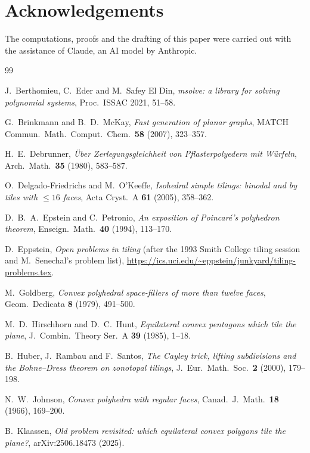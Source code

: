 \documentclass[11pt]{amsart}
\theoremstyle{definition}
\begin{document}
\section*{Acknowledgements}
The computations, proofs and the drafting of this paper were carried out with the assistance of Claude, an AI model
by Anthropic.

\begin{thebibliography}{99}

 J.~Berthomieu, C.~Eder and M.~Safey El Din, \emph{msolve: a library for solving polynomial
systems}, Proc.\ ISSAC 2021, 51--58.

 G.~Brinkmann and B.~D.~McKay, \emph{Fast generation of planar graphs}, MATCH Commun.\ Math.\
Comput.\ Chem.\ \textbf{58} (2007), 323--357.

 H.~E.~Debrunner, \emph{\"Uber Zerlegungsgleichheit von Pflasterpolyedern mit W\"urfeln}, Arch.\
Math.\ \textbf{35} (1980), 583--587.

 O.~Delgado-Friedrichs and M.~O'Keeffe, \emph{Isohedral simple tilings: binodal and by tiles with
$\le16$ faces}, Acta Cryst.\ A \textbf{61} (2005), 358--362.

 D.~B.~A.~Epstein and C.~Petronio, \emph{An exposition of Poincar\'e's polyhedron theorem},
Enseign.\ Math.\ \textbf{40} (1994), 113--170.

 D.~Eppstein, \emph{Open problems in tiling} (after the 1993 Smith College tiling session and M.~Senechal's
problem list), \url{https://ics.uci.edu/~eppstein/junkyard/tiling-problems.tex}.

\bibitem{Gol79} M.~Goldberg, \emph{Convex polyhedral space-fillers of more than twelve faces}, Geom.\ Dedicata
\textbf{8} (1979), 491--500.

 M.~D.~Hirschhorn and D.~C.~Hunt, \emph{Equilateral convex pentagons which tile the plane}, J.\
Combin.\ Theory Ser.\ A \textbf{39} (1985), 1--18.

\bibitem{HRS00} B.~Huber, J.~Rambau and F.~Santos, \emph{The Cayley trick, lifting subdivisions and the
Bohne--Dress theorem on zonotopal tilings}, J.\ Eur.\ Math.\ Soc.\ \textbf{2} (2000), 179--198.

\bibitem{Joh66} N.~W.~Johnson, \emph{Convex polyhedra with regular faces}, Canad.\ J.\ Math.\ \textbf{18} (1966),
169--200.

\bibitem{Kla25} B.~Klaassen, \emph{Old problem revisited: which equilateral convex polygons tile the plane?},
arXiv:2506.18473 (2025).


\end{thebibliography}
\end{document}
